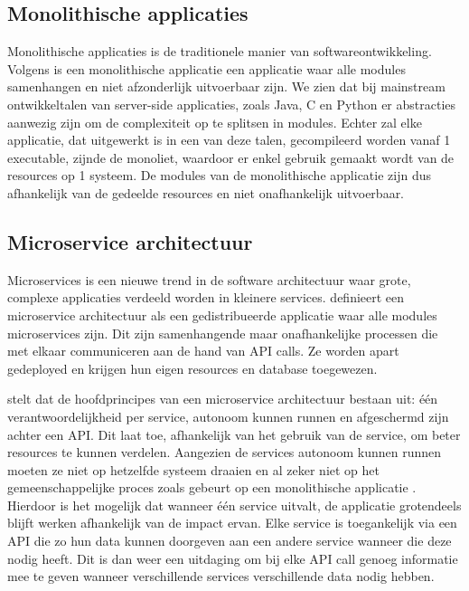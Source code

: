 \subsection{Monolithische applicaties}
Monolithische applicaties is de traditionele manier van softwareontwikkeling. Volgens \textcite{Dragoni2016} is een monolithische applicatie een applicatie waar alle modules samenhangen en niet afzonderlijk uitvoerbaar zijn. We zien dat bij mainstream ontwikkeltalen van server-side applicaties, zoals Java, C en Python er abstracties aanwezig zijn om de complexiteit op te splitsen in modules. Echter zal elke applicatie, dat uitgewerkt is in een van deze talen, gecompileerd worden vanaf 1 executable, zijnde de monoliet, waardoor er enkel gebruik gemaakt wordt van de resources op 1 systeem. De modules van de monolithische applicatie zijn dus afhankelijk van de gedeelde resources en niet onafhankelijk uitvoerbaar.

\subsection{Microservice architectuur}
Microservices is een nieuwe trend in de software architectuur waar grote, complexe applicaties verdeeld worden in kleinere services. \textcite{Dragoni2016} definieert een microservice architectuur als een gedistribueerde applicatie waar alle modules microservices zijn. Dit zijn samenhangende maar onafhankelijke processen die met elkaar communiceren aan de hand van API calls. Ze worden apart gedeployed en krijgen hun eigen resources en database toegewezen. 

\textcite{Blinowski2022} stelt dat de hoofdprincipes van een microservice architectuur bestaan uit: één verantwoordelijkheid per service, autonoom kunnen runnen en afgeschermd zijn achter een API. Dit laat toe, afhankelijk van het gebruik van de service, om beter resources te kunnen verdelen. Aangezien de services autonoom kunnen runnen moeten ze niet op hetzelfde systeem draaien en al zeker niet op het gemeenschappelijke proces zoals gebeurt op een monolithische applicatie \autocite{Dragoni2017}. Hierdoor is het mogelijk dat wanneer één service uitvalt, de applicatie grotendeels blijft werken afhankelijk van de impact ervan. Elke service is toegankelijk via een API die zo hun data kunnen doorgeven aan een andere service wanneer die deze nodig heeft. Dit is dan weer een uitdaging om bij elke API call genoeg informatie mee te geven wanneer verschillende services verschillende data nodig hebben.

